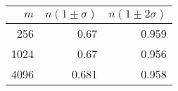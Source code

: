 \begin{tabular}{rrr}
$m$ & $n(1 \pm \sigma)$ & $n(1 \pm 2\sigma)$\\\hline
256 & 0.67 & 0.959\\
1024 & 0.67 & 0.956\\
4096 & 0.681 & 0.958\\
\end{tabular}

